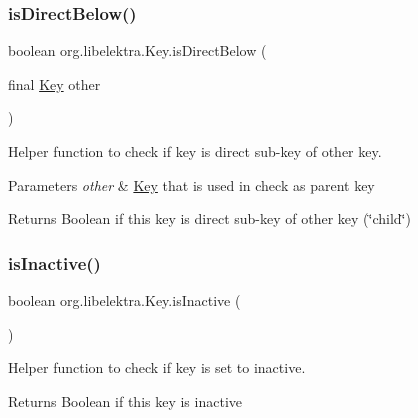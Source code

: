 \subsubsection{\texorpdfstring{is\+Direct\+Below()}{isDirectBelow()}}
{\footnotesize\ttfamily boolean org.\+libelektra.\+Key.\+is\+Direct\+Below (\begin{DoxyParamCaption}\item[{final \hyperlink{classorg_1_1libelektra_1_1Key}{Key}}]{other }\end{DoxyParamCaption})\hspace{0.3cm}{\ttfamily [inline]}}



Helper function to check if key is direct sub-\/key of other key. 


\begin{DoxyParams}{Parameters}
{\em other} & \hyperlink{classorg_1_1libelektra_1_1Key}{Key} that is used in check as parent key \\
\hline
\end{DoxyParams}
\begin{DoxyReturn}{Returns}
Boolean if this key is direct sub-\/key of other key (\char`\"{}child\char`\"{}) 
\end{DoxyReturn}
\mbox{\label{classorg_1_1libelektra_1_1Key_a1707144b9d6c0c29531e3e372e1ffaee}} 
\subsubsection{\texorpdfstring{is\+Inactive()}{isInactive()}}
{\footnotesize\ttfamily boolean org.\+libelektra.\+Key.\+is\+Inactive (\begin{DoxyParamCaption}{ }\end{DoxyParamCaption})\hspace{0.3cm}{\ttfamily [inline]}}



Helper function to check if key is set to inactive. 

\begin{DoxyReturn}{Returns}
Boolean if this key is inactive 
\end{DoxyReturn}
\mbox{\label{classorg_1_1libelektra_1_1Key_adfcebdd407d050b0626a8f2cfec00e8b}} 
